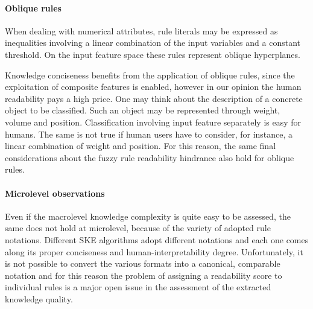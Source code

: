 \documentclass[sigconf]{acmart}
\begin{document}
\paragraph{Oblique rules}

When dealing with numerical attributes, rule literals may be expressed as inequalities involving a linear combination of the input variables and a constant threshold.
%
On the input feature space these rules represent oblique hyperplanes.

Knowledge conciseness benefits from the application of oblique rules, since the exploitation of composite features is enabled, however in our opinion the human readability pays a high price.
%
One may think about the description of a concrete object to be classified.
%
Such an object may be represented through weight, volume and position.
%
Classification involving input feature separately is easy for humans.
%
The same is not true if human users have to consider, for instance, a linear combination of weight and position.
%
For this reason, the same final considerations about the fuzzy rule readability hindrance also hold for oblique rules.

\paragraph{Microlevel observations}

Even if the macrolevel knowledge complexity is quite easy to be assessed, the same does not hold at microlevel, because of the variety of adopted rule notations.
%
Different SKE algorithms adopt different notations and each one comes along its proper conciseness and human-interpretability degree.
%
Unfortunately, it is not possible to convert the various formats into a canonical, comparable notation and for this reason the problem of assigning a readability score to individual rules is a major open issue in the assessment of the extracted knowledge quality.





\end{document}
